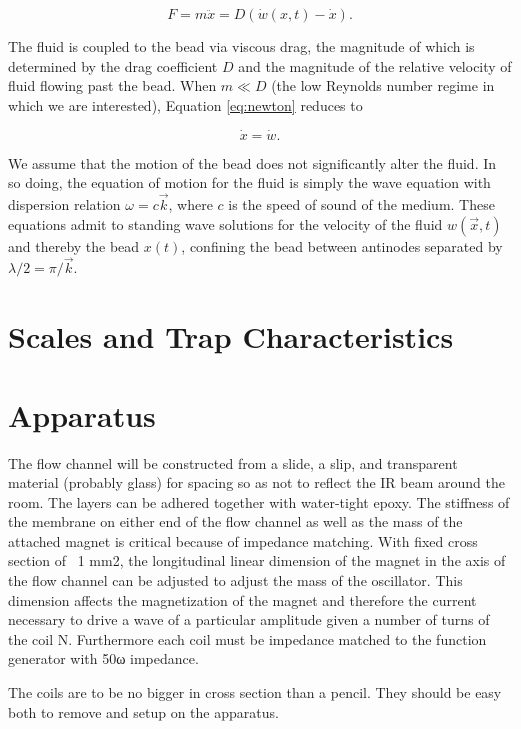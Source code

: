 \begin{equation}
F = m \ddot{x} = D\left(\dot{w}\left(x,t\right)-\dot{x}\right)\label{eq:newton}.
\end{equation}

The fluid is coupled to the bead via viscous drag, the magnitude of which is determined by the drag coefficient $D$ and the magnitude of the relative velocity of fluid flowing past the bead.   When $m \ll D$ (the low Reynolds number regime in which we are interested), Equation \ref{eq:newton} reduces to

\begin{equation}
\dot{x} = \dot{w}.
\end{equation}

We assume that the motion of the bead does not significantly alter the fluid.  In so doing, the equation of motion for the fluid is simply the wave equation with dispersion relation $\omega = c \vec{k}$, where $c$ is the speed of sound of the medium.  These equations admit to standing wave solutions for the velocity of the fluid $w\left(\vec{x},t\right)$ and thereby the bead $x\left(t\right)$, confining the bead between antinodes separated by $\lambda/2 = \pi/\vec{k}$.

\section{Scales and Trap Characteristics}

\section{Apparatus}

The flow channel will be constructed from a slide, a slip, and transparent material (probably glass) for spacing so as not to reflect the IR beam around the room. The layers can be adhered together with water-tight epoxy. The stiffness of the membrane on either end of the flow channel as well as the mass of the attached magnet is critical because of impedance matching. With fixed cross section of ~1 mm2, the longitudinal linear dimension of the magnet in the axis of the flow channel can be adjusted to adjust the mass of the oscillator. This dimension affects the magnetization of the magnet and therefore the current necessary to drive a wave of a particular amplitude given a number of turns of the coil N. Furthermore each coil must be impedance matched to the function generator with 50ω impedance.

The coils are to be no bigger in cross section than a pencil. They should be easy both to remove and setup on the apparatus.

